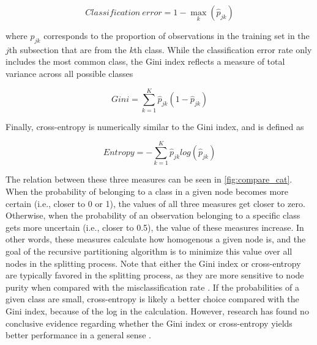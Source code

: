 \begin{equation}
Classification \ error = 1 - \max_k(\hat{p}_{jk})
\end{equation}


\noindent where $\hat{p}_{jk}$ corresponds to the proportion of observations in the training set in the $j$th subsection that are from the $k$th class. While the classification error rate only includes the most common class, the Gini index reflects a measure of total variance across all possible classes


\begin{equation}
Gini = \sum_{k=1}^{K}\hat{p}_{jk}(1 - \hat{p}_{jk})
\end{equation}


\noindent Finally, cross-entropy is numerically similar to the Gini index, and is defined as


\begin{equation}
Entropy = -\sum_{k=1}^{K}\hat{p}_{jk}log(\hat{p}_{jk})
\end{equation}


	The relation between these three measures can be seen in \autoref{fig:compare_cat}. When the probability of belonging to a class in a given node becomes more certain (i.e., closer to 0 or 1), the values of all three measures get closer to zero. Otherwise, when the probability of an observation belonging to a specific class gets more uncertain (i.e., closer to 0.5), the value of these measures increase. In other words, these measures calculate how homogenous a given node is, and the goal of the recursive partitioning algorithm is to minimize this value over all nodes in the splitting process. Note that either the Gini index or cross-entropy are typically favored in the splitting process, as they are more sensitive to node purity when compared with the misclassification rate \cite{james2013introduction}. If the probabilities of a given class are small, cross-entropy is likely a better choice compared with the Gini index, because of the log in the calculation. However, research has found no conclusive evidence regarding whether the Gini index or cross-entropy yields better performance in a general sense \cite{raileanu2004theoretical}.


